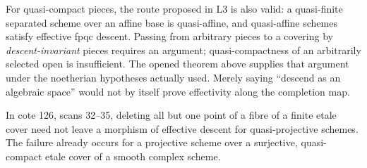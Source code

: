 For quasi-compact pieces, the route proposed in L3 is also valid: a
quasi-finite separated scheme over an affine base is quasi-affine, and
quasi-affine schemes satisfy effective fpqc descent. Passing from arbitrary
pieces to a covering by \emph{descent-invariant} pieces requires an argument;
quasi-compactness of an arbitrarily selected open is insufficient. The
opened theorem above supplies that argument under the noetherian
hypotheses actually used. Merely saying ``descend as an algebraic space''
would not by itself prove effectivity along the completion map.

\begin{theorem}\label{A:nonfinite-descent}
In cote 126, scans 32--35, deleting all but one point of a fibre of a
finite etale cover need not leave a morphism of effective descent for
quasi-projective schemes. The failure already occurs for a projective
scheme over a surjective, quasi-compact etale cover of a smooth complex
scheme.
\end{theorem}
